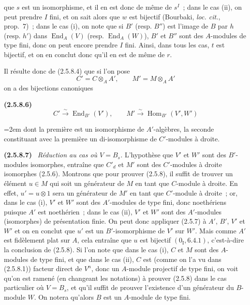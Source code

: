 \documentclass[10pt,oneside]{book}
\newcommand{\oldpage}[2][]{%
  \setcounter{footnote}{0}%
  \marginpar{\scriptsize\textbf{#1}~|~#2}\ignorespaces}
\newenvironment{env}[1][]{\par\medskip\noindent\textbf{(#1)}\ }{\par}
\begin{document}
\oldpage[IV-2]{26}
que $s$ est un isomorphisme, et il en est donc de même de $s^I$~; dans le cas
(ii), on peut prendre $I$ fini, et on sait alors que $w$ est bijectif
(Bourbaki, \emph{loc. cit.}, prop.~7)~; dans le cas (i), on note que si $B'$
(resp. $B''$) est l'image de $B$ par $h$ (resp. $h'$) dans
$\operatorname{End}_A(V)$ (resp. $\operatorname{End}_A(W)$), $B'$ et $B''$
sont des $A$-modules de type fini, donc on peut encore prendre $I$ fini.
Ainsi, dans tous les cas, $t$ est bijectif, et on en conclut donc qu'il en est
de même de $r$.

Il résulte donc de (2.5.8.4) que si l'on pose
\[
C'=C\otimes_A A',\qquad M'=M\otimes_A A'
\]
on a des bijections canoniques

\begin{env}[2.5.8.6]
\label{IV.2.5.8.6-fr}
\[
C'\xrightarrow{\sim}\operatorname{End}_{B'}(V'),\qquad
M'\xrightarrow{\sim}\operatorname{Hom}_{B'}(V',W')
\]
{\emergencystretch=2em
dont la première est un isomorphisme de $A'$-algèbres, la seconde constituant
avec la première un di-isomorphisme de $C'$-modules à droite.\par}
\end{env}

\begin{env}[2.5.8.7]
\label{IV.2.5.8.7-fr}
\emph{Réduction au cas où $V=B_s$.} L'hypothèse que $V'$ et $W'$ sont des
$B'$-modules isomorphes, entraîne que $C'_d$ et $M'$ sont des $C'$-modules à
droite isomorphes (2.5.6). Montrons que pour prouver (2.5.8), il suffit de
trouver un élément $u\in M$ qui soit un générateur de $M$ en tant que
$C$-module à droite. En effet, $u'=u\otimes1$ sera un générateur de $M'$ en
tant que $C'$-module à droite~; or, dans le cas (i), $V'$ et $W'$ sont des
$A'$-modules de type fini, donc noethériens puisque $A'$ est noethérien~;
dans le cas (ii), $V'$ et $W'$ sont des $A'$-modules (isomorphes) de
présentation finie. On peut donc appliquer (2.5.7) à $A'$, $B'$, $V'$ et
$W'$ et on en conclut que $u'$ est un $B'$-isomorphisme de $V'$ sur $W'$.
Mais comme $A'$ est fidèlement plat sur $A$, cela entraîne que $u$ est
bijectif $(0_{\mathrm I},6.4.1)$, c'est-à-dire la conclusion de (2.5.8). Si
l'on note que dans le cas (i), $C$ et $M$ sont des $A$-modules de type fini,
et que dans le cas (ii), $C$ est (comme on l'a vu dans (2.5.8.1)) facteur
direct de $V^n$, donc un $A$-module projectif de type fini, on voit qu'on est
ramené (en changeant les notations) à prouver (2.5.8) dans le cas particulier
où $V=B_s$, et qu'il suffit de prouver l'existence d'un générateur du
$B$-module $W$. On notera qu'alors $B$ est un $A$-module de type fini.
\end{env}
\end{document}
